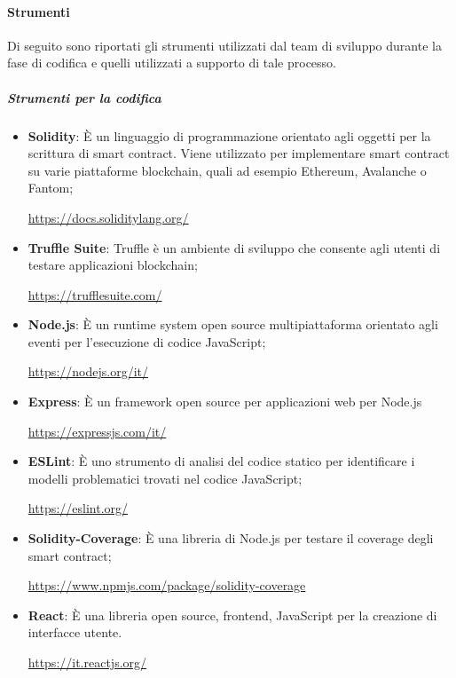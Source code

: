 \paragraph{Strumenti}    \label{paragraph:Strumenti}
Di seguito sono riportati gli strumenti utilizzati dal team di sviluppo durante la fase di codifica e quelli utilizzati a supporto di tale processo.
\subparagraph{Strumenti per la codifica}
\begin{itemize}
    \item \textbf{Solidity}: È un linguaggio di programmazione orientato agli oggetti per la scrittura di smart contract\glo{}. Viene utilizzato per implementare smart contract\glo{} su varie piattaforme blockchain\glo{}, quali ad esempio Ethereum\glo{}, Avalanche\glo{} o Fantom\glo{};
          \begin{center}\url{https://docs.soliditylang.org/}\end{center}
    \item \textbf{Truffle Suite}:
          Truffle è un ambiente di sviluppo che consente agli utenti di testare applicazioni blockchain\glo{};
          \begin{center}\url{https://trufflesuite.com/}\end{center}
    \item \textbf{Node.js}: È un runtime system\glo{} open source\glo{} multipiattaforma orientato agli eventi per l'esecuzione di codice JavaScript\glo{};
          \begin{center}\url{https://nodejs.org/it/}\end{center}
    \item \textbf{Express}: È un framework\glo{} open source\glo{} per applicazioni web per Node.js
          \begin{center}\url{https://expressjs.com/it/}\end{center}
    \item \textbf{ESLint}: È uno strumento di analisi del codice statico per identificare i modelli problematici trovati nel codice JavaScript\glo{};
          \begin{center}\url{https://eslint.org/}\end{center}
    \item \textbf{Solidity-Coverage}: È una libreria di Node.js per testare il coverage degli smart contract;
          \begin{center}\url{https://www.npmjs.com/package/solidity-coverage}\end{center}
    \item \textbf{React}: È una libreria open source\glo{}, frontend\glo{}, JavaScript\glo{} per la creazione di interfacce utente.
          \begin{center}\url{https://it.reactjs.org/}\end{center}
\end{itemize}
